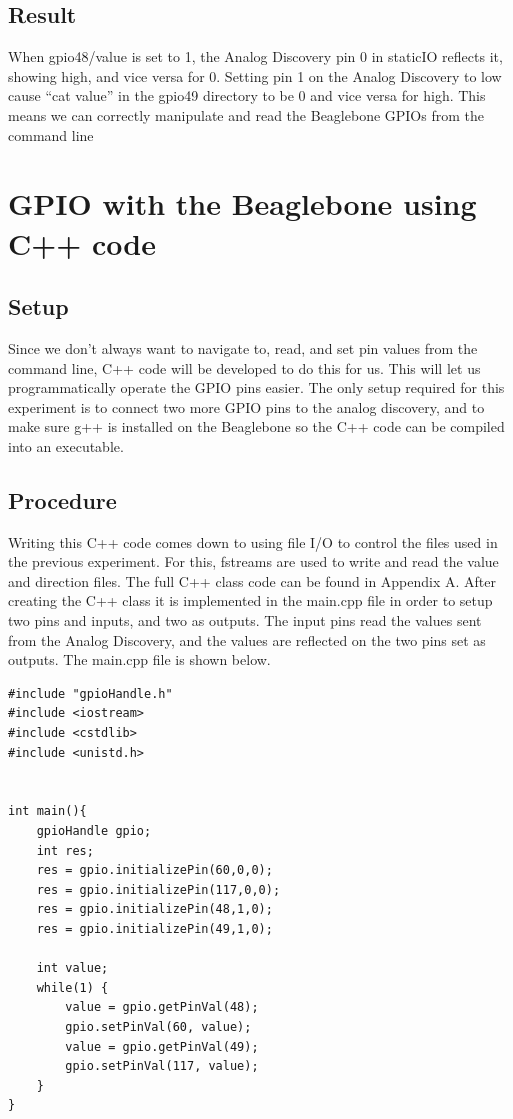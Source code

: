 \documentclass{article}
\begin{document}
\subsection{Result}
When gpio48/value is set to 1, the Analog Discovery pin 0 in staticIO reflects it, showing high, and vice versa for 0. Setting pin 1 on the Analog Discovery to low cause “cat value” in the gpio49 directory to be 0 and vice versa for high. This means we can correctly manipulate and read the Beaglebone GPIOs from the command line
\clearpage
\section{GPIO with the Beaglebone using C++ code}
\subsection{Setup}
Since we don’t always want to navigate to, read, and set pin values from the command line, C++ code will be developed to do this for us. This will let us programmatically operate the GPIO pins easier. The only setup required for this experiment is to connect two more GPIO pins to the analog discovery, and to make sure g++ is installed on the Beaglebone so the C++ code can be compiled into an executable.

\subsection{Procedure}
Writing this C++ code comes down to using file I/O to control the files used in the previous experiment. For this, fstreams are used to write and read the value and direction files. The full C++ class code can be found in Appendix A. After creating the C++ class it is implemented in the main.cpp file in order to setup two pins and inputs, and two as outputs. The input pins read the values sent from the Analog Discovery, and the values are reflected on the two pins set as outputs. The main.cpp file is shown below.
\begin{center}
	\begin{lstlisting}
#include "gpioHandle.h" 
#include <iostream> 
#include <cstdlib> 
#include <unistd.h> 


int main(){ 
	gpioHandle gpio; 
	int res; 
	res = gpio.initializePin(60,0,0); 
	res = gpio.initializePin(117,0,0); 
	res = gpio.initializePin(48,1,0); 
	res = gpio.initializePin(49,1,0); 
	
	int value;
	while(1) {
		value = gpio.getPinVal(48);
		gpio.setPinVal(60, value);
		value = gpio.getPinVal(49);
		gpio.setPinVal(117, value);
	}
} 
	\end{lstlisting}
\end{center}
\end{document}
